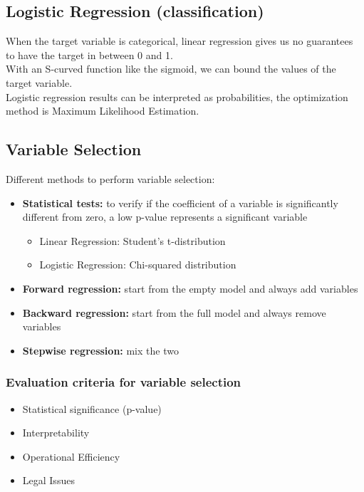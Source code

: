     \subsection{Logistic Regression (classification)}
        When the target variable is categorical, linear regression gives us no guarantees to have the target in between 0 and 1.\\
        With an S-curved function like the sigmoid, we can bound the values of the target variable.\\
        Logistic regression results can be interpreted as probabilities, the optimization method is Maximum Likelihood Estimation.
    \subsection{Variable Selection}
        Different methods to perform variable selection:
        \begin{itemize}
            \item \textbf{Statistical tests:} to verify if the coefficient of a variable is significantly different from zero, a low p-value represents a significant variable
            \begin{itemize}
                \item Linear Regression: Student's t-distribution 
                \item Logistic Regression: Chi-squared distribution 
            \end{itemize}
            \item \textbf{Forward regression:} start from the empty model and always add variables
            \item \textbf{Backward regression:} start from the full model and always remove variables
            \item \textbf{Stepwise regression:} mix the two
        \end{itemize}
        \subsubsection{Evaluation criteria for variable selection}
            \begin{itemize}
                \item Statistical significance (p-value)
                \item Interpretability
                \item Operational Efficiency 
                \item Legal Issues 
            \end{itemize}
